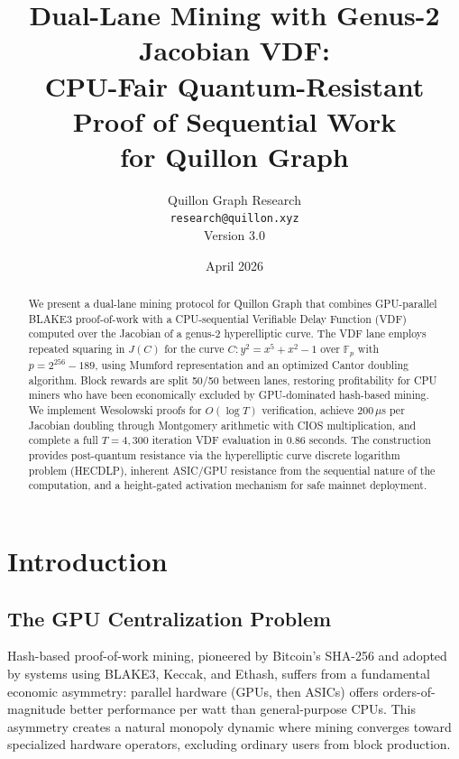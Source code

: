 \documentclass[11pt,a4paper]{article}
\title{
\textbf{Dual-Lane Mining with Genus-2 Jacobian VDF:}\\[0.3em]
\Large CPU-Fair Quantum-Resistant Proof of Sequential Work\\[0.3em]
\large for Quillon Graph
}
\author{
    Quillon Graph Research\\
    \texttt{research@quillon.xyz}\\[0.5em]
    \small Version 3.0
}
\date{April 2026}
\begin{document}
\maketitle

\begin{abstract}
We present a dual-lane mining protocol for Quillon Graph that combines GPU-parallel BLAKE3 proof-of-work with a CPU-sequential Verifiable Delay Function (VDF) computed over the Jacobian of a genus-2 hyperelliptic curve. The VDF lane employs repeated squaring in $J(C)$ for the curve $C: y^2 = x^5 + x^2 - 1$ over $\mathbb{F}_p$ with $p = 2^{256} - 189$, using Mumford representation and an optimized Cantor doubling algorithm. Block rewards are split 50/50 between lanes, restoring profitability for CPU miners who have been economically excluded by GPU-dominated hash-based mining. We implement Wesolowski proofs for $O(\log T)$ verification, achieve 200\,$\mu$s per Jacobian doubling through Montgomery arithmetic with CIOS multiplication, and complete a full $T = 4{,}300$ iteration VDF evaluation in 0.86 seconds. The construction provides post-quantum resistance via the hyperelliptic curve discrete logarithm problem (HECDLP), inherent ASIC/GPU resistance from the sequential nature of the computation, and a height-gated activation mechanism for safe mainnet deployment.
\end{abstract}

\tableofcontents
\newpage

\section{Introduction}

\subsection{The GPU Centralization Problem}

Hash-based proof-of-work mining, pioneered by Bitcoin's SHA-256 and adopted by systems using BLAKE3, Keccak, and Ethash, suffers from a fundamental economic asymmetry: parallel hardware (GPUs, then ASICs) offers orders-of-magnitude better performance per watt than general-purpose CPUs. This asymmetry creates a natural monopoly dynamic where mining converges toward specialized hardware operators, excluding ordinary users from block production.
\end{document}
